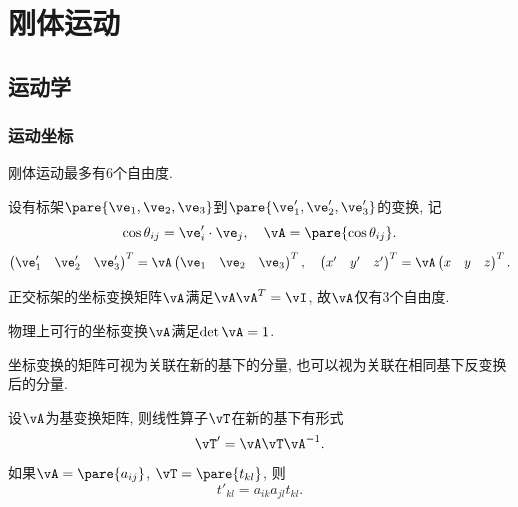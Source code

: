 \documentclass[../TheoreticalMechanics.tex]{subfiles}
\begin{document}
\graphicspath{{RigidBody/}}

\section{刚体运动} %
\label{sec:刚体运动}

\subsection{运动学} %
\label{sub:运动学}

\subsubsection{运动坐标} %
\label{ssub:运动坐标}

\begin{lemma}[刚体自由度]
    刚体运动最多有$6$个自由度.
\end{lemma}
\begin{lemma}[坐标变换]
    设有标架$\pare{\ve_1, \ve_2, \ve_3}$到$\pare{\ve'_1,\ve'_2,\ve'_3}$的变换, 记
    \[ \cos\theta_{ij} = \ve'_i \cdot \ve_j,\quad \vA = \pare{\cos\theta_{ij}}. \]
    \[ \begin{pmatrix}
        \ve'_1 & \ve'_2 & \ve'_3
    \end{pmatrix}^T = \vA \begin{pmatrix}
        \ve_1 & \ve_2 & \ve_3
    \end{pmatrix}^T,\quad \begin{pmatrix}
        x' & y' & z'
    \end{pmatrix}^T = \vA \begin{pmatrix}
        x & y & z
    \end{pmatrix}^T. \]
\end{lemma}
\begin{lemma}[坐标变换的自由度]
    正交标架的坐标变换矩阵$\vA$满足$\vA\vA^T=\vI$, 故$\vA$仅有$3$个自由度.
\end{lemma}
\begin{lemma}[坐标变换保持行列式]
    物理上可行的坐标变换$\vA$满足$\det\vA = 1$.
\end{lemma}
\begin{lemma}[坐标变换的相对性]
    坐标变换的矩阵可视为关联在新的基下的分量, 也可以视为关联在相同基下反变换后的分量.
\end{lemma}
\begin{lemma}[坐标变换下的矩阵]
    设$\vA$为基变换矩阵, 则线性算子$\vT$在新的基下有形式
    \[ \vT' = \vA \vT \vA^{-1}. \]
    如果$\vA=\pare{a_{ij}}$, $\vT = \pare{t_{kl}}$, 则
    \[ t'_{kl} = a_{ik}a_{jl}t_{kl}. \]
\end{lemma}
\end{document}
